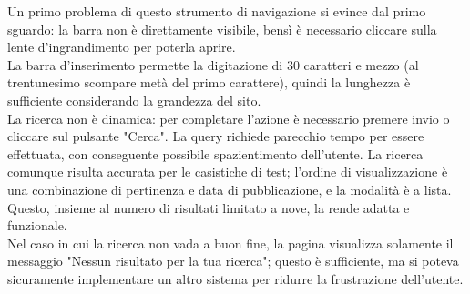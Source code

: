 Un primo problema di questo strumento di navigazione si evince dal primo sguardo: la barra non è direttamente visibile, bensì è necessario cliccare sulla lente d'ingrandimento per poterla aprire. \\
La barra d'inserimento permette la digitazione di 30 caratteri e mezzo (al trentunesimo scompare metà del primo carattere), quindi la lunghezza è sufficiente considerando la grandezza del sito. \\
La ricerca non è dinamica: per completare l'azione è necessario premere invio o cliccare sul pulsante "Cerca". La query richiede parecchio tempo per essere effettuata, con conseguente possibile spazientimento dell'utente. La ricerca comunque risulta accurata per le casistiche di test; l'ordine di visualizzazione è una combinazione di pertinenza e data di pubblicazione, e la modalità è a lista. Questo, insieme al numero di risultati limitato a nove, la rende adatta e funzionale.\\
Nel caso in cui la ricerca non vada a buon fine, la pagina visualizza solamente il messaggio "Nessun risultato per la tua ricerca"; questo è sufficiente, ma si poteva sicuramente implementare un altro sistema per ridurre la frustrazione dell'utente.
